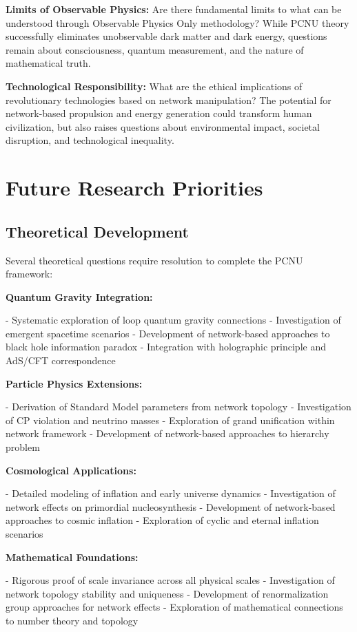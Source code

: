 \documentclass[11pt,a4paper]{article}
\begin{document}
\textbf{Limits of Observable Physics:}
Are there fundamental limits to what can be understood through Observable Physics Only methodology? While PCNU theory successfully eliminates unobservable dark matter and dark energy, questions remain about consciousness, quantum measurement, and the nature of mathematical truth.

\textbf{Technological Responsibility:}
What are the ethical implications of revolutionary technologies based on network manipulation? The potential for network-based propulsion and energy generation could transform human civilization, but also raises questions about environmental impact, societal disruption, and technological inequality.

\section{Future Research Priorities}

\subsection{Theoretical Development}

Several theoretical questions require resolution to complete the PCNU framework:

\textbf{Quantum Gravity Integration:}

- Systematic exploration of loop quantum gravity connections
- Investigation of emergent spacetime scenarios
- Development of network-based approaches to black hole information paradox
- Integration with holographic principle and AdS/CFT correspondence

\textbf{Particle Physics Extensions:}

- Derivation of Standard Model parameters from network topology
- Investigation of CP violation and neutrino masses
- Exploration of grand unification within network framework
- Development of network-based approaches to hierarchy problem

\textbf{Cosmological Applications:}

- Detailed modeling of inflation and early universe dynamics
- Investigation of network effects on primordial nucleosynthesis
- Development of network-based approaches to cosmic inflation
- Exploration of cyclic and eternal inflation scenarios

\textbf{Mathematical Foundations:}

- Rigorous proof of scale invariance across all physical scales
- Investigation of network topology stability and uniqueness
- Development of renormalization group approaches for network effects
- Exploration of mathematical connections to number theory and topology
\end{document}
